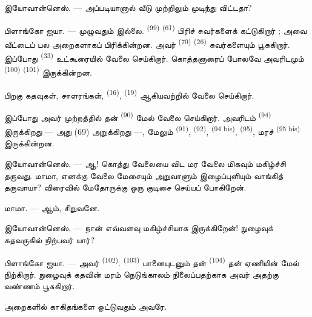 \textsc{இயோவான்னெஸ்}. --- அப்படியானால் வீடு முற்றிலும் முடிந்து விட்டதா?

\VUsaut{3.0mm}
\VUsaut{3.0mm}

\textsc{பிளாங்கோ ஐயா}. --- முழுவதும் இல்லை. 
\textsuperscript{(99)}  \textsuperscript{(61)} பிரிச்
சுவர்களைக் கட்டுகிறார் ; அவை வீட்டைப் பல அறைகளாகப் பிரிக்கின்றன.
அவர்  \textsuperscript{(70)}
 \textsuperscript{(26)} சுவர்களையும் பூசுகிறார். இப்போது
 \textsuperscript{(33)} உட்கூரையில் வேலை செய்கிறார்.
கொத்தனாரைப் போலவே அவரிடமும்  \textsuperscript{(100)}
 \textsuperscript{(101)} இருக்கின்றன.

பிறகு  கதவுகள், சாளரங்கள், 
\textsuperscript{(16)},  \textsuperscript{(19)}
ஆகியவற்றில் வேலை செய்கிறார்.

இப்போது அவர் முற்றத்தில் தன்  \textsuperscript{(90)}
மேல் வேலை செய்கிறார். அவரிடம்  \textsuperscript{(94)}
இருக்கிறது — அது  (69) அறுக்கிறது —, மேலும்
 \textsuperscript{(91)}, 
\textsuperscript{(92)},  \textsuperscript{(94 bis)},
 \textsuperscript{(95)}, மரச் 
\textsuperscript{(95 bis)} இருக்கின்றன.

\textsc{இயோவான்னெஸ்}. --- ஆ! கொத்து வேலையை விட மர வேலை மிகவும்
மகிழ்ச்சி தருவது. மாமா, எனக்கு வேலை மேசையும் அறுவாளும் இழைப்புளியும்
வாங்கித் தருவாயா? விரைவில் மேதோருக்கு ஒரு குடிசை செய்யப் போகிறேன்.

\textsc{மாமா}. --- ஆம், சிறுவனே.

\textsc{இயோவான்னெஸ்}. --- நான் எவ்வளவு மகிழ்ச்சியாக இருக்கிறேன்! நுழைவுக்
கதவருகில் நிற்பவர் யார்?

\VUsaut{3.0mm}
\VUsaut{3.0mm}

\textsc{பிளாங்கோ ஐயா}. --- அவர் 
\textsuperscript{(102)}.  \textsuperscript{(103)} பானையுடனும்
தன்  \textsuperscript{(104)} தன் ஏணியின் மேல்
நிற்கிறார். நுழைவுக் கதவின் மரம் நெடுங்காலம் நிலைப்பதற்காக அவர் அதற்கு
வண்ணம் பூசுகிறார்.

அறைகளில் காகிதங்களை ஒட்டுவதும் அவரே.

